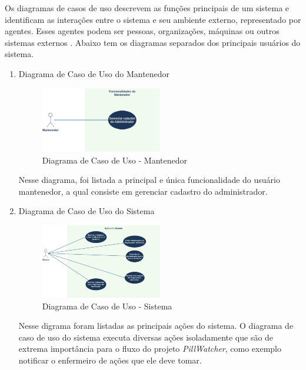 Os diagramas de casos de uso descrevem as funções principais de um sistema e identificam as interações entre o sistema e seu ambiente externo, representado por agentes. Esses agentes podem ser pessoas, organizações, máquinas ou outros sistemas externos \cite{IBM}. Abaixo tem os diagramas separados dos principais usuários do sistema.

\begin{enumerate}
    \item Diagrama de Caso de Uso do Mantenedor
    
\begin{figure}[H]
    \centering
    \includegraphics[width=0.5\textwidth]{figuras/software/UML/matenedor-us.png}
    \caption{Diagrama de Caso de Uso - Mantenedor}
    \label{fig:mantenedor_us}
\end{figure}

Nesse diagrama, foi listada a principal e única funcionalidade do usuário mantenedor, a qual consiste em gerenciar cadastro do administrador.

    \item Diagrama de Caso de Uso do Sistema
    
\begin{figure}[H]
    \centering
    \includegraphics[width=0.5\textwidth]{figuras/software/UML/sistema-us.png}
    \caption{Diagrama de Caso de Uso - Sistema}
    \label{fig:sistema_us}
\end{figure}

Nesse digrama foram listadas as principais ações do sistema. O diagrama de caso de uso do sistema executa diversas ações isoladamente que são de extrema importância para o fluxo do projeto \emph{PillWatcher}, como exemplo notificar o enfermeiro de ações que ele deve tomar.


\end{enumerate}
